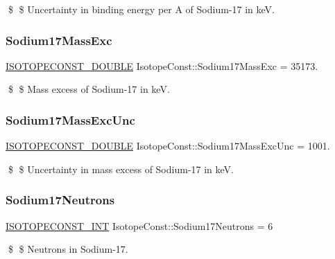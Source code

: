 \$ \$ Uncertainty in binding energy per A of Sodium-\/17 in keV. \mbox{\label{group___isotope_const-_sodium-_na17_ga4c7fad07934fca6f1b3cb33c15506fb2}} 
\subsubsection{\texorpdfstring{Sodium17\+Mass\+Exc}{Sodium17MassExc}}
{\footnotesize\ttfamily \mbox{\hyperlink{group___isotope_const-_macros_ga8f45a7272ce02c0b4c65c44636ed719a}{I\+S\+O\+T\+O\+P\+E\+C\+O\+N\+S\+T\+\_\+\+D\+O\+U\+B\+LE}} Isotope\+Const\+::\+Sodium17\+Mass\+Exc = 35173.}

\$ \$ Mass excess of Sodium-\/17 in keV. \mbox{\label{group___isotope_const-_sodium-_na17_ga77d1900c58d0b2edf392a473d3f65da6}} 
\subsubsection{\texorpdfstring{Sodium17\+Mass\+Exc\+Unc}{Sodium17MassExcUnc}}
{\footnotesize\ttfamily \mbox{\hyperlink{group___isotope_const-_macros_ga8f45a7272ce02c0b4c65c44636ed719a}{I\+S\+O\+T\+O\+P\+E\+C\+O\+N\+S\+T\+\_\+\+D\+O\+U\+B\+LE}} Isotope\+Const\+::\+Sodium17\+Mass\+Exc\+Unc = 1001.}

\$ \$ Uncertainty in mass excess of Sodium-\/17 in keV. \mbox{\label{group___isotope_const-_sodium-_na17_gaa3ee23854da10c20aad95a0acf779e78}} 
\subsubsection{\texorpdfstring{Sodium17\+Neutrons}{Sodium17Neutrons}}
{\footnotesize\ttfamily \mbox{\hyperlink{group___isotope_const-_macros_ga5f18360b3e99483a35c32d789e62621c}{I\+S\+O\+T\+O\+P\+E\+C\+O\+N\+S\+T\+\_\+\+I\+NT}} Isotope\+Const\+::\+Sodium17\+Neutrons = 6}

\$ \$ Neutrons in Sodium-\/17. \mbox{\label{group___isotope_const-_sodium-_na17_gae8759ee9b7a6674168ffe67a0606144a}} 
